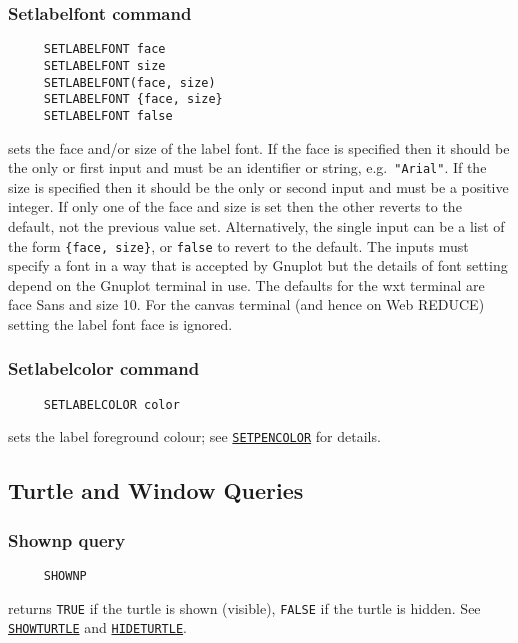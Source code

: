 \subsubsection*{Setlabelfont command}
\begin{verbatim}
     SETLABELFONT face
     SETLABELFONT size
     SETLABELFONT(face, size)
     SETLABELFONT {face, size}
     SETLABELFONT false
\end{verbatim}
\label{logoturtle:setlabelfont}
sets the face and/or size of the label font.  If the face is specified
then it should be the only or first input and must be an identifier or
string, e.g.\ \texttt{"Arial"}.  If the size is specified then it
should be the only or second input and must be a positive integer.  If
only one of the face and size is set then the other reverts to the
default, not the previous value set.  Alternatively, the single input
can be a list of the form \texttt{\{face, size\}}, or \texttt{false}
to revert to the default.  The inputs must specify a font in a way
that is accepted by Gnuplot but the details of font setting depend on
the Gnuplot terminal in use.  The defaults for the wxt terminal are
face Sans and size 10.  For the canvas terminal (and hence on Web
REDUCE) setting the label font face is ignored.

\subsubsection*{Setlabelcolor command}
\begin{verbatim}
     SETLABELCOLOR color
\end{verbatim}
sets the label foreground colour; see
\hyperref[logoturtle:setpencolor]{\texttt{SETPENCOLOR}} for details.


\subsection{Turtle and Window Queries}

\subsubsection*{Shownp query}
\begin{verbatim}
     SHOWNP
\end{verbatim}
returns \texttt{TRUE} if the turtle is shown (visible), \texttt{FALSE}
if the turtle is hidden.  See
\hyperref[logoturtle:showturtle]{\texttt{SHOWTURTLE}} and
\hyperref[logoturtle:hideturtle]{\texttt{HIDETURTLE}}.

